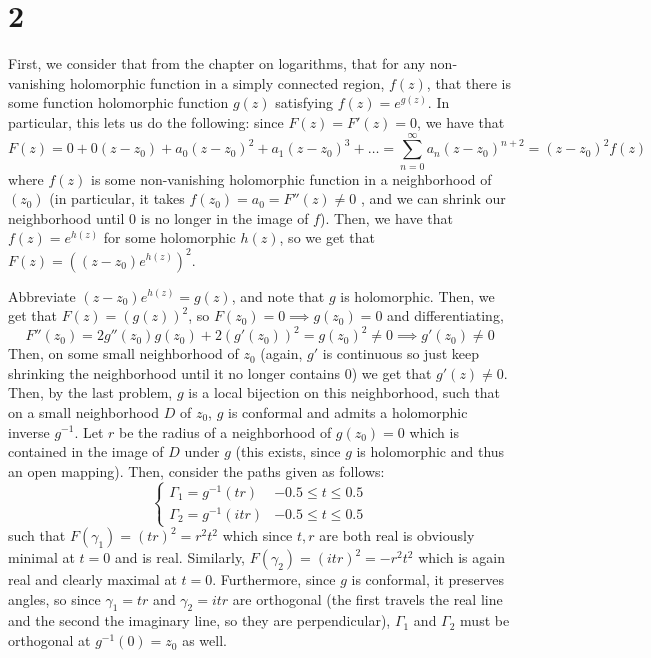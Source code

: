 \documentclass[12pt,letterpaper]{article}
\theoremstyle{definition}
\begin{document}
\section*{2}

First, we consider that from the chapter on logarithms, that for any non-vanishing holomorphic function in a simply connected region, $f(z)$, that there is some function holomorphic function $g(z)$ satisfying $f(z) = e^{g(z)}$. In particular, this lets us do the following: since $F(z) = F'(z) = 0$, we have that
\[
  F(z) = 0 + 0(z - z_{0}) + a_{0}(z - z_{0})^{2} + a_{1}(z - z_{0})^{3} + \dots = \sum_{n=0}^{\infty}a_{n}(z - z_{0})^{n + 2} = (z - z_{0})^{2}f(z)
\]
where $f(z)$ is some non-vanishing holomorphic function in a neighborhood of $(z_{0})$ (in particular, it takes $f(z_{0}) = a_{0} = F''(z) \neq 0$ , and we can shrink our neighborhood until $0$ is no longer in the image of $f$). Then, we have that $f(z) = e^{h(z)}$ for some holomorphic $h(z)$, so we get that $F(z) = ((z - z_{0})e^{h(z)})^{2}$.

Abbreviate $(z - z_{0})e^{h(z)} = g(z)$, and note that $g$ is holomorphic. Then, we get that $F(z) = (g(z))^{2}$, so $F(z_{0}) = 0 \implies g(z_{0}) = 0$ and differentiating,
\[
  F''(z_0) = 2g''(z_0)g(z_0) + 2(g'(z_{0}))^{2} = g(z_{0})^{2} \neq 0 \implies g'(z_0) \neq 0
\]
Then, on some small neighborhood of $z_{0}$ (again, $g'$ is continuous so just keep shrinking the neighborhood until it no longer contains $0$) we get that $g'(z) \neq 0$. Then, by the last problem, $g$ is a local bijection on this neighborhood, such that on a small neighborhood $D$ of $z_{0}$, $g$ is conformal and admits a holomorphic inverse $g^{-1}$. Let $r$ be the radius of a neighborhood of $g(z_{0}) = 0$ which is contained in the image of $D$ under $g$ (this exists, since $g$ is holomorphic and thus an open mapping). Then, consider the paths given as follows:
\[
  \begin{cases}
    \Gamma_{1} = g^{-1}(tr) & -0.5 \leq t \leq 0.5 \\
    \Gamma_{2} = g^{-1}(itr) & -0.5 \leq t \leq 0.5
  \end{cases}
\]
such that $F(\gamma_{1}) = (tr)^{2} = r^{2}t^{2}$ which since $t,r$ are both real is obviously minimal at $t = 0$ and is real. Similarly, $F(\gamma_{2}) = (itr)^{2} = -r^{2}t^{2}$ which is again real and clearly maximal at $t = 0$. Furthermore, since $g$ is conformal, it preserves angles, so since $\gamma_{1} = tr$ and $\gamma_{2} = itr$ are orthogonal (the first travels the real line and the second the imaginary line, so they are perpendicular), $\Gamma_{1}$ and $\Gamma_{2}$ must be orthogonal at $g^{-1}(0) = z_{0}$ as well.
\end{document}

